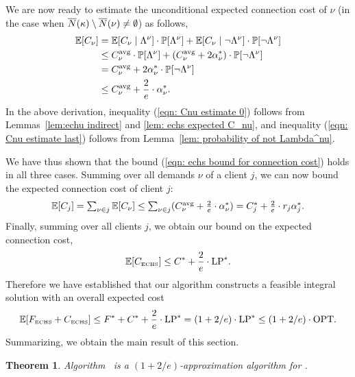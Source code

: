 \documentclass[oneside,final]{ucr}
\newtheorem{theorem}{Theorem}
\begin{document}
We are now ready to estimate the unconditional expected connection cost of $\nu$
(in the case when ${\overline{N}}(\kappa)\setminus {\overline{N}}(\nu)\neq\emptyset$)
as follows,
%
\begin{align}
  \notag
  \mathbb{E}[C_\nu] &= \mathbb{E}[C_{\nu} \mid \Lambda^\nu] \cdot \mathbb{P}[\Lambda^\nu] 
	+ \mathbb{E}[C_{\nu} \mid \neg \Lambda^\nu] \cdot	\mathbb{P}[\neg \Lambda^\nu]
  \\
  &\leq C^{{\mbox{\scriptsize\rm avg}}}_{\nu} \cdot \mathbb{P}[\Lambda^\nu] 
		+ (C^{{\mbox{\scriptsize\rm avg}}}_{\nu} + 2\alpha_{\nu}^\ast)  \cdot \mathbb{P}[\neg \Lambda^\nu]
  \label{eqn: Cnu estimate 0}
  \\
  &= C^{{\mbox{\scriptsize\rm avg}}}_{\nu} 
	+  2\alpha_{\nu}^\ast \cdot \mathbb{P}[\neg \Lambda^\nu]
		\notag
	\\
	&\le C^{{\mbox{\scriptsize\rm avg}}}_{\nu} + \frac{2}{e}\cdot\alpha_{\nu}^\ast.
	  \label{eqn: Cnu estimate last}
\end{align}
%
In the above derivation, inequality (\ref{eqn: Cnu estimate 0})
follows from Lemmas~\ref{lem:echu indirect} and \ref{lem: echs expected C_nu}, 
and inequality (\ref{eqn: Cnu estimate last}) follows from
Lemma~\ref{lem: probability of not Lambda^nu}.

\medskip

We have thus shown that the bound (\ref{eqn: echs bound for connection cost})
holds in all three cases.
Summing over all demands $\nu$ of a client $j$, we can now bound
the expected connection cost of client $j$:
%
\begin{equation*}
  \mathbb{E}[C_j] = \textstyle\sum_{\nu\in j} \mathbb{E}[C_\nu] 
\leq {\textstyle\sum_{\nu\in j} (C^{{\mbox{\scriptsize\rm avg}}}_{\nu} + \frac{2}{e}\cdot\alpha_{\nu}^\ast) }
  = { C_j^\ast + \frac{2}{e}\cdot r_j\alpha_j^\ast}.
\end{equation*}
%
Finally, summing over all clients $j$, we obtain our bound on
the expected connection cost,
%
\begin{equation*}
 \mathbb{E}[ C_{\mbox{\tiny\rm ECHS}}] \le C^\ast + \frac{2}{e}\cdot\mbox{\rm LP}^\ast.
\end{equation*}
% 
Therefore we have established that
our algorithm constructs a feasible integral solution with
an overall expected cost 
%
\begin{equation*}
  \label{eq:chudakall}
	 \mathbb{E}[ F_{\mbox{\tiny\rm ECHS}} + C_{\mbox{\tiny\rm ECHS}}]
	\le
  	F^\ast + C^\ast + \frac{2}{e}\cdot \mbox{\rm LP}^\ast = (1+2/e)\cdot \mbox{\rm LP}^\ast
  \leq (1+2/e)\cdot \mbox{\rm OPT}.
\end{equation*}
%
Summarizing, we obtain the main result of this section.

\begin{theorem}\label{thm:1736}
  Algorithm~{\ECHS} is a $(1+2/e)$-approximation algorithm for \FTFP.
\end{theorem}
\end{document}
